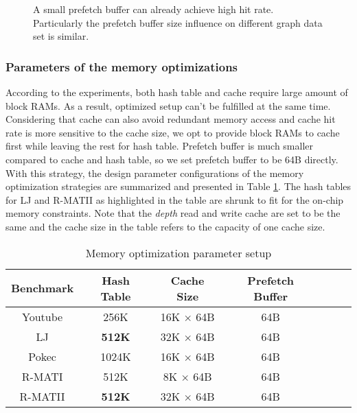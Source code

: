 \begin{figure}
    \caption{A small prefetch buffer can already achieve high hit rate.
    Particularly the prefetch buffer size influence on different graph 
    data set is similar.}
\label{fig:prefetch-hit}
\end{figure}

\subsubsection{Parameters of the memory optimizations}
According to the experiments, both hash table and cache require large amount of 
block RAMs. As a result, optimized setup can't be fulfilled at the same time.
Considering that cache can also avoid redundant memory access and 
cache hit rate is more sensitive to the cache size, we opt to 
provide block RAMs to cache first while leaving the rest for hash table. Prefetch 
buffer is much smaller compared to cache and hash table, so we set prefetch buffer 
to be 64B directly. With this strategy, the design parameter configurations 
of the memory optimization strategies are summarized and presented in 
Table \ref{tab:parameter-setup}. The hash tables for LJ and R-MATII 
as highlighted in the table are shrunk to fit for the on-chip memory constraints. 
Note that the \textit{depth} read and write cache 
are set to be the same and the cache size in the table refers to the capacity of 
one cache size.

\begin{table}
  \caption{Memory optimization parameter setup}
  \label{tab:parameter-setup}
    \centering
  \begin{tabular}{ccccccc}
    \toprule
      Benchmark & Hash Table & Cache Size & Prefetch Buffer \\
    \midrule
      Youtube  & 256K  & 16K $\times$ 64B & 64B \\
      LJ       & \textbf{512K} & 32K $\times$ 64B & 64B \\
      Pokec    & 1024K & 16K $\times$ 64B & 64B \\
      R-MATI   & 512K  & 8K $\times$  64B & 64B \\
      R-MATII  & \textbf{512K} & 32K $\times$ 64B & 64B \\
  \bottomrule
\end{tabular}
\end{table}

